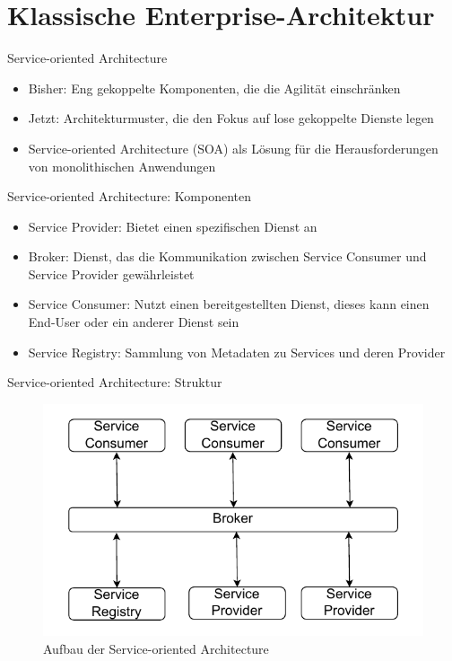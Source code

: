 \section{Klassische Enterprise-Architektur}


\begin{frame}{Service-oriented Architecture}
  \begin{itemize}
    \item Bisher: Eng gekoppelte Komponenten, die die Agilität einschränken
    \item Jetzt: Architekturmuster, die den Fokus auf lose gekoppelte Dienste legen
    \item Service-oriented Architecture (SOA) als Lösung für die Herausforderungen von monolithischen Anwendungen
  \end{itemize}
\end{frame}

\begin{frame}{Service-oriented Architecture: Komponenten}
  \begin{itemize}
    \item Service Provider: Bietet einen spezifischen Dienst an
    \item Broker: Dienst, das die Kommunikation zwischen Service Consumer und Service Provider gewährleistet
    \item Service Consumer: Nutzt einen bereitgestellten Dienst, dieses kann einen End-User oder ein anderer Dienst sein
    \item Service Registry: Sammlung von Metadaten zu Services und deren Provider
  \end{itemize}
\end{frame}

\begin{frame}{Service-oriented Architecture: Struktur}
  \begin{figure}[!h]
    \centering
    \includegraphics[scale=0.80]{imglib/soa/soa}
    \caption{Aufbau der Service-oriented Architecture}
    \label{fig:soa}
  \end{figure}
\end{frame}

